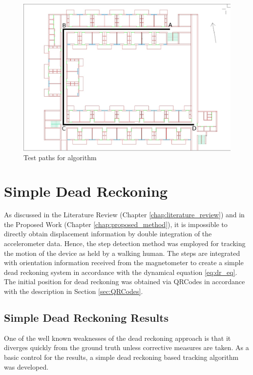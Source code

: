 \begin{figure}
    \centering
    \includegraphics[width=5in]{figures/test_paths.jpg}
    \caption{Test paths for algorithm\label{fig:test_paths}}
\end{figure}


\section{Simple Dead Reckoning}

As discussed in the Literature Review (Chapter \ref{chap:literature_review}) and
in the Proposed Work (Chapter \ref{chap:proposed_method}), it is impossible to
directly obtain displacement information by double integration of the
accelerometer data. Hence, the step detection method was employed for tracking
the motion of the device as held by a walking human. The steps are integrated
with orientation information received from the magnetometer to create a 
simple dead reckoning system in accordance with the dynamical equation 
\eqref{eq:dr_eq}. The initial position for dead reckoning was obtained via
QRCodes in accordance with the description in Section \ref{sec:QRCodes}.


\subsection{Simple Dead Reckoning Results}

One of the well known weaknesses of the dead reckoning approach is that it
diverges quickly from the ground truth unless corrective measures are taken.
As a basic control for the results, a simple dead reckoning based 
tracking algorithm was developed. 

